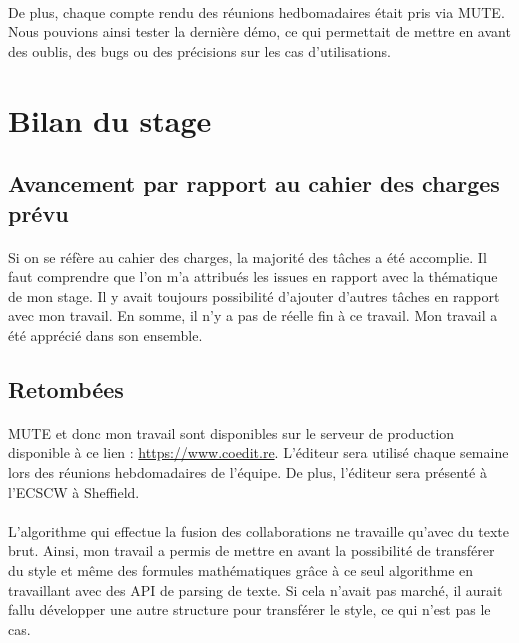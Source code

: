 \documentclass[12pt]{article}
\begin{document}
\paragraph{}
De plus, chaque compte rendu des réunions hedbomadaires était pris via MUTE. Nous pouvions ainsi tester la dernière démo, ce qui permettait de mettre en avant des oublis, des bugs ou des précisions sur les cas d'utilisations.\\

\newpage
\section{Bilan du stage}
\subsection{Avancement par rapport au cahier des charges prévu}
\paragraph{}
Si on se réfère au cahier des charges, la majorité des tâches a été accomplie. Il faut comprendre que l'on m'a attribués les issues en rapport avec la thématique de mon stage. Il y avait toujours possibilité d'ajouter d'autres tâches en rapport avec mon travail. En somme, il n'y a pas de réelle fin à ce travail. Mon travail a été apprécié dans son ensemble.

\subsection{Retombées}
\paragraph{}
MUTE et donc mon travail sont disponibles sur le serveur de production disponible à ce lien : \href{https://www.coedit.re}{https://www.coedit.re}. L'éditeur sera utilisé chaque semaine lors des réunions hebdomadaires de l'équipe. De plus, l'éditeur sera présenté à l'ECSCW à Sheffield.
\paragraph{}
L'algorithme qui effectue la fusion des collaborations ne travaille qu'avec du texte brut. Ainsi, mon travail a permis de mettre en avant la possibilité de transférer du style et même des formules mathématiques grâce à ce seul algorithme en travaillant avec des API de parsing de texte. Si cela n'avait pas marché, il aurait fallu développer une autre structure pour transférer le style, ce qui n'est pas le cas.
\end{document}
